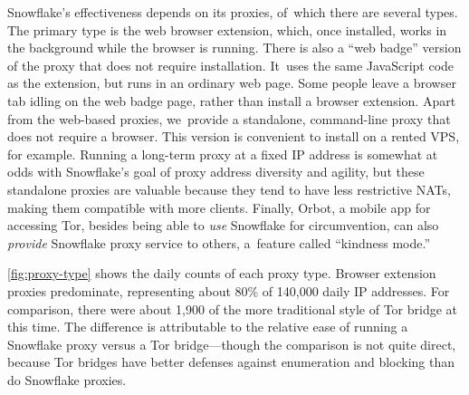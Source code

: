 \documentclass[letterpaper,twocolumn]{article}
\begin{document}
Snowflake's effectiveness depends on its proxies,
of~which there are several types.
The primary type is the web browser extension,
which, once installed, works in the background
while the browser is running.
There is also a ``web badge'' version of the proxy that does not require installation.
It~uses the same JavaScript code as the extension, but runs in an ordinary web page.
Some people leave a browser tab idling on the web badge page,
rather than install a browser extension.
Apart from the web-based proxies,
we~provide a standalone, command-line proxy
that does not require a browser.
This version is convenient to install on a rented VPS, for example.
Running a long-term proxy at a fixed IP address
is somewhat at odds with Snowflake's goal of proxy address diversity and agility,
but these standalone proxies are valuable because
they tend to have less restrictive NATs,
making them compatible with more clients.
Finally, Orbot, a mobile app for accessing Tor,
besides being able to \emph{use} Snowflake for circumvention,
can also \emph{provide} Snowflake proxy service to others,
a~feature called ``kindness mode.''

\autoref{fig:proxy-type} shows the daily counts
of each proxy type.
Browser extension proxies predominate,
representing about 80\%
of 140,000 daily IP addresses.
For comparison, there were about 1,900
of the more traditional style of Tor bridge at this time.
The difference is attributable to the relative ease
of running a Snowflake proxy versus a Tor bridge---though
the comparison is not quite direct,
because Tor bridges have better defenses
against enumeration and blocking than do Snowflake proxies.
\end{document}
